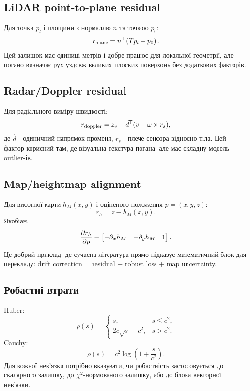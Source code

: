 \subsection{LiDAR point-to-plane residual}

Для точки $p_l$ і площини з нормаллю $n$ та точкою $p_0$:
\begin{equation}
 r_{\mathrm{plane}} = n^{\mathsf T}\left(Tp_l-p_0\right).
\end{equation}
Цей залишок має одиниці метрів і добре працює для локальної геометрії, але погано визначає рух уздовж великих плоских поверхонь без додаткових факторів.

\subsection{Radar/Doppler residual}

Для радіального виміру швидкості:
\begin{equation}
 r_{\mathrm{doppler}}=z_v - \hat d^{\mathsf T}(v+\omega\times r_s),
\end{equation}
де $\hat d$ - одиничний напрямок променя, $r_s$ - плече сенсора відносно тіла. Цей фактор корисний там, де візуальна текстура погана, але має складну модель outlier-ів.

\subsection{Map/heightmap alignment}

Для висотної карти $h_M(x,y)$ і оціненого положення $p=(x,y,z)$:
\begin{equation}
 r_h = z-h_M(x,y).
\end{equation}
Якобіан:
\begin{equation}
 \frac{\partial r_h}{\partial p}=\begin{bmatrix}-\partial_xh_M & -\partial_yh_M & 1\end{bmatrix}.
\end{equation}
Це добрий приклад, де сучасна література прямо підказує математичний блок для перекладу: drift correction = residual + robust loss + map uncertainty.

\subsection{Робастні втрати}

Huber:
\begin{equation}
 \rho(s)=\begin{cases}s,&s\le c^2,\\2c\sqrt{s}-c^2,&s>c^2.\end{cases}
\end{equation}
Cauchy:
\begin{equation}
 \rho(s)=c^2\log\left(1+\frac{s}{c^2}\right).
\end{equation}
Для кожної нев'язки потрібно вказувати, чи робастність застосовується до скалярного залишку, до $\chi^2$-нормованого залишку, або до блока векторної нев'язки.

